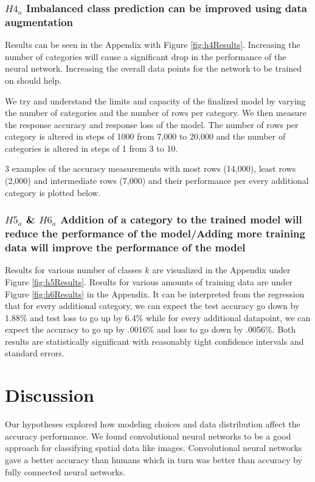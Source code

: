 \documentclass[11pt]{article}
\begin{document}
\subsubsection{$H4_a$\: Imbalanced class prediction can be improved using
  data augmentation}

Results can be seen in the Appendix with Figure \ref{fig:h4Results}.
Increasing the number of categories will cause a significant drop in the
performance of the neural network. Increasing the overall data points for
the network to be trained on should help. 

We try and understand the limits and capacity of the finalized model by
varying the number of categories and the number of rows per category. We
then measure the response accuracy and response loss of the model. The
number of rows per category is altered in steps of 1000 from 7,000 to 20,000
and the number of categories is altered in steps of 1 from 3 to 10.

3 examples of the accuracy measurements with most rows (14,000), least rows
(2,000) and intermediate rows (7,000) and their performance per every
additional category is plotted below.

\subsubsection{$H5_a$ \& $H6_a$\: Addition of a category to the trained model
  will reduce the performance of the model/Adding more training data will
  improve the performance of the model}

Results for various number of classes $k$ are visualized in the Appendix
under Figure \ref{fig:h5Results}. Results for various amounts of training
data are under Figure \ref{fig:h6Results} in the Appendix. It can be
interpreted from the regression that for every additional category,
we can expect the test accuracy go down by 1.88\% and test loss to go up by
6.4\% while for every additional datapoint, we can expect the accuracy to go
up by .0016\% and loss to go down by .0056\%. Both results are statistically
significant with reasonably tight confidence intervals and standard errors.

\section{Discussion}

Our hypotheses explored how modeling choices and data distribution affect
the accuracy performance. We found convolutional neural networks to be a
good approach for classifying spatial data like images. Convolutional neural
networks gave a better accuracy than humans which in turn was better than
accuracy by fully connected neural networks. 
\end{document}
